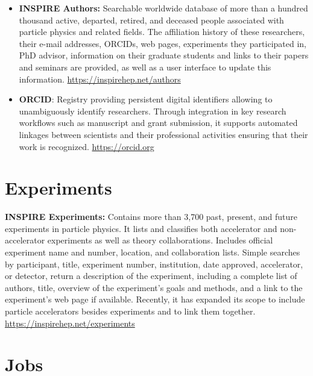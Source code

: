 \begin{itemize}
\item
  \textbf{INSPIRE Authors:} Searchable worldwide database of more than a hundred thousand active, departed, retired, and deceased people associated with
  particle physics and related fields. The affiliation history of these
  researchers, their e-mail addresses, ORCIDs, web pages, experiments
  they participated in, PhD advisor, information on their graduate
  students and links to their papers and seminars are provided, as well as a user interface to update this
  information. \url{https://inspirehep.net/authors}

\item
  \textbf{ORCID}: Registry providing persistent digital identifiers
  allowing to unambiguously identify researchers. Through integration in
  key research workflows such as manuscript and grant submission, it
  supports automated linkages between scientists and their professional
  activities ensuring that their work is recognized.
  \url{https://orcid.org}
\end{itemize}

\section{Experiments}\label{databases:sec:experiments}

  \textbf{INSPIRE Experiments:} Contains more than 3,700 past, present,
  and future experiments in particle physics. It lists and classifies both accelerator and
  non-accelerator experiments as well as theory collaborations. Includes official experiment name and
  number, location, and collaboration lists. Simple searches by
  participant, title, experiment number, institution, date approved,
  accelerator, or detector, return a description of the experiment,
  including a complete list of authors, title, overview of the
  experiment's goals and methods, and a link to the experiment's web
  page if available. Recently, it has expanded its scope to include
  particle accelerators besides experiments and to link them together.
  \url{https://inspirehep.net/experiments}

\section{Jobs}\label{databases:sec:jobs}

